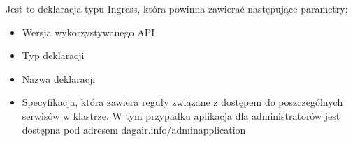 Jest to deklaracja typu Ingress, która powinna zawierać następujące parametry:

\begin{itemize} %
    \item Wersja wykorzystywanego API
    \item Typ deklaracji
    \item Nazwa deklaracji
    \item Specyfikacja, która zawiera reguły związane z dostępem do poszczególnych 
    serwisów w klastrze. W tym przypadku aplikacja dla administratorów jest dostępna 
    pod adresem dagair.info/adminapplication
\end{itemize}
